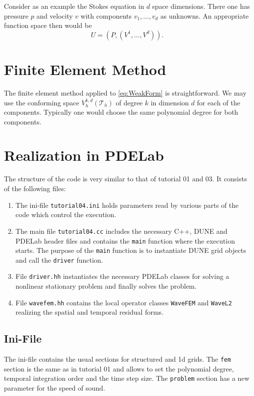 \documentclass[a4paper,12pt]{article}
\begin{document}
Consider as an example the Stokes equation in $d$ space dimensions.
There one has pressure $p$ and velocity $v$ with components $v_1,\ldots,v_d$
as unknowns. An appropriate function space then would be
$$ U = (P,(V^1,\ldots,V^d)).$$

\section{Finite Element Method}

The finite element method applied to \eqref{eq:WeakForm} is straightforward.
We may use the conforming space $V_h^{k,d}(\mathcal{T}_h)$ of degree $k$
in dimension $d$ for each of the components. Typically one would choose
the same polynomial degree for both components.

\section{Realization in PDELab}

The structure of the code is very similar to that of tutorial 01 and 03.
It consists of the following files:
\begin{enumerate}[1)]
\item The ini-file
\lstinline{tutorial04.ini} holds parameters read by various parts of the code
which control the execution.
\item The main file \lstinline{tutorial04.cc} includes the necessary C++,
DUNE and PDELab header files
and contains the \lstinline{main} function where the execution starts.
The purpose of the \lstinline{main} function is
to instantiate DUNE grid objects and call the \lstinline{driver} function.
\item File \lstinline{driver.hh} instantiates the necessary PDELab classes
for solving a nonlinear stationary problem and finally solves the problem.
\item File \lstinline{wavefem.hh} contains the local operator classes
\lstinline{WaveFEM} and \lstinline{WaveL2} realizing the spatial
and temporal residual forms.
\end{enumerate}

\subsection{Ini-File}

The ini-file contains the usual sections for structured and 1d grids. The
\lstinline{fem} section is the same as in tutorial 01 and allows to set
the polynomial degree, temporal integration order and the time step size.
The \lstinline{problem} section has a new parameter for the speed of sound.

\end{document}
